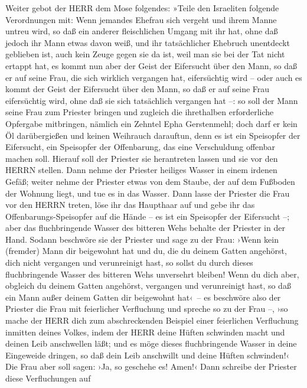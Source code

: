 Weiter gebot der HERR dem Mose folgendes:
»Teile den Israeliten folgende Verordnungen mit: Wenn
jemandes Ehefrau sich vergeht und ihrem Manne untreu wird,
so daß ein anderer fleischlichen Umgang mit ihr hat, ohne
daß jedoch ihr Mann etwas davon weiß, und ihr tatsächlicher Ehebruch
unentdeckt geblieben ist, auch kein Zeuge gegen sie da ist, weil man sie
bei der Tat nicht ertappt hat, es kommt nun aber der
Geist der Eifersucht über den Mann, so daß er auf seine Frau, die sich
wirklich vergangen hat, eifersüchtig wird -- oder auch es kommt der
Geist der Eifersucht über den Mann, so daß er auf seine Frau
eifersüchtig wird, ohne daß sie sich tatsächlich vergangen hat --:
so soll der Mann seine Frau zum Priester bringen und
zugleich die ihrethalben erforderliche Opfergabe mitbringen, nämlich ein
Zehntel Epha Gerstenmehl; doch darf er kein Öl darübergießen und keinen
Weihrauch darauftun, denn es ist ein Speisopfer der Eifersucht, ein
Speisopfer der Offenbarung, das eine Verschuldung offenbar machen soll.
Hierauf soll der Priester sie herantreten lassen und sie
vor den HERRN stellen. Dann nehme der Priester heiliges
Wasser in einem irdenen Gefäß; weiter nehme der Priester etwas von dem
Staube, der auf dem Fußboden der Wohnung liegt, und tue es in das
Wasser. Dann lasse der Priester die Frau vor den HERRN
treten, löse ihr das Haupthaar auf und gebe ihr das
Offenbarungs-Speisopfer auf die Hände -- es ist ein Speisopfer der
Eifersucht --; aber das fluchbringende Wasser des bitteren Wehs behalte
der Priester in der Hand. Sodann beschwöre sie der
Priester und sage zu der Frau: ›Wenn kein (fremder) Mann dir beigewohnt
hat und du, die du deinem Gatten angehörst, dich nicht vergangen und
verunreinigt hast, so sollst du durch dieses fluchbringende Wasser des
bitteren Wehs unversehrt bleiben! Wenn du dich aber,
obgleich du deinem Gatten angehörst, vergangen und verunreinigt hast, so
daß ein Mann außer deinem Gatten dir beigewohnt hat‹~--
es beschwöre also der Priester die Frau mit feierlicher
Verfluchung und spreche so zu der Frau --, ›so mache der HERR dich zum
abschreckenden Beispiel einer feierlichen Verfluchung inmitten deines
Volkes, indem der HERR deine Hüften schwinden macht und deinen Leib
anschwellen läßt; und es möge dieses fluchbringende
Wasser in deine Eingeweide dringen, so daß dein Leib anschwillt und
deine Hüften schwinden!‹ Die Frau aber soll sagen: ›Ja, so geschehe es!
Amen!‹ Dann schreibe der Priester diese Verfluchungen auf
